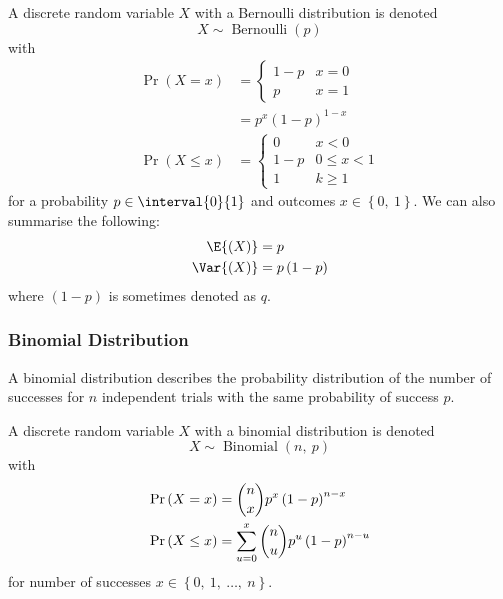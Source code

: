 \documentclass{article}
\begin{document}
A discrete random variable \(X\) with a Bernoulli distribution is denoted
\begin{equation*}
    X \sim \operatorname{Bernoulli}{\left( p \right)}
\end{equation*}
with
\begin{align*}
    \Pr{\left( X = x \right)}    & = \begin{cases}
                                         1 - p & x = 0 \\
                                         p     & x = 1
                                     \end{cases}                    \\
                                 & = p^x \left( 1 - p \right)^{1 - x} \\
    \Pr{\left( X \leq x \right)} & = \begin{cases}
                                         0     & x < 0        \\
                                         1 - p & 0 \leq x < 1 \\
                                         1     & k \geq 1
                                     \end{cases}
\end{align*}
for a probability \(p \in \interval{0}{1}\) and outcomes \(x \in \left\{ 0,\: 1 \right\}\).
We can also summarise the following:
\begin{align*}
    \E{\left( X \right)}   & = p                      \\
    \Var{\left( X \right)} & = p \left( 1 - p \right)
\end{align*}
where \(\left( 1 - p \right)\) is sometimes denoted as \(q\).
\subsubsection{Binomial Distribution}
A binomial distribution describes the probability distribution of the number of successes
for \(n\) independent trials with the same probability of success \(p\).

A discrete random variable \(X\) with a binomial distribution is denoted
\begin{equation*}
    X \sim \operatorname{Binomial}{\left( n,\: p \right)}
\end{equation*}
with
\begin{align*}
    \Pr{\left( X = x \right)}    & = \dbinom{n}{x} p^x \left( 1 - p \right)^{n - x}                \\
    \Pr{\left( X \leq x \right)} & = \sum_{u = 0}^x \dbinom{n}{u} p^u \left( 1 - p \right)^{n - u}
\end{align*}
for number of successes \(x \in \left\{ 0,\: 1,\: \dots,\: n \right\}\).
\end{document}
